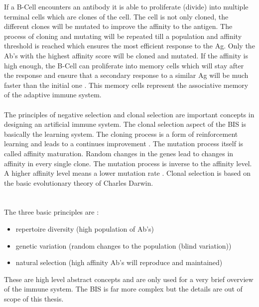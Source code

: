 If a B-Cell encounters an antibody it is able to proliferate (divide) into multiple terminal cells which are clones of the cell. The cell is not only cloned, the different clones will be mutated to improve the affinity to the antigen. The process of cloning and mutating will be repeated till a population and affinity threshold is reached which ensures the most efficient response to the Ag. Only the Ab’s with the highest affinity score will be cloned and mutated. If the affinity is high enough, the B-Cell can proliferate into memory cells which will stay after the response and ensure that a secondary response to a similar Ag will be much faster than the initial one \cite{DEC02}. This memory cells represent the associative memory of the adaptive immune system. 
\\\\
The principles of negative selection and clonal selection are important concepts in designing an artificial immune system. The clonal selection aspect of the BIS is basically the learning system. The cloning process is a form of reinforcement learning and leads to a continues improvement \cite{DEC02}.
The mutation process itself is called affinity maturation. Random changes in the genes lead to changes in affinity in every single clone. The mutation process is inverse to the affinity level.  A higher affinity level means a lower mutation rate \cite{DEC02}.  
Clonal selection is based on the basic evolutionary theory of Charles Darwin.\\\\\\ The three basic principles are \cite{DEC02}:
\\
\begin{itemize}
	\item 	repertoire diversity (high population of Ab's)
	\item 	genetic variation (random changes to the population (blind variation))
	\item 	natural selection (high affinity Ab's will reproduce and maintained) 
	
\end{itemize}

These are high level abstract concepts and are only used for a very brief overview of the immune system. The BIS is far more complex but the details are out of scope of this thesis.



